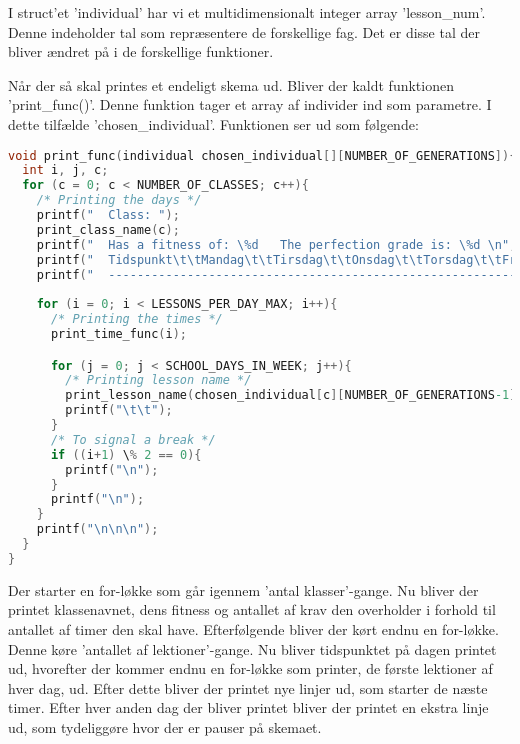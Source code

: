 I struct’et ’individual’ har vi et multidimensionalt integer array ’lesson\_num’. Denne indeholder tal som repræsentere de forskellige fag. Det er disse tal der bliver ændret på i de forskellige funktioner. 

Når der så skal printes et endeligt skema ud. Bliver der kaldt funktionen ’print\_func()’. Denne funktion tager et array af individer ind som parametre. I dette tilfælde ’chosen\_individual’. Funktionen ser ud som følgende:
\begin{lstlisting}[language = C]
void print_func(individual chosen_individual[][NUMBER_OF_GENERATIONS]){
  int i, j, c;
  for (c = 0; c < NUMBER_OF_CLASSES; c++){
    /* Printing the days */
    printf("  Class: ");
    print_class_name(c);
    printf("  Has a fitness of: \%d   The perfection grade is: \%d \n", chosen_individual[c][NUMBER_OF_GENERATIONS-1].fitness, chosen_individual[c][NUMBER_OF_GENERATIONS].perfection);
    printf("  Tidspunkt\t\tMandag\t\tTirsdag\t\tOnsdag\t\tTorsdag\t\tFredag\n");
    printf("  ------------------------------------------------------------------------------------------------\n");
    
    for (i = 0; i < LESSONS_PER_DAY_MAX; i++){
      /* Printing the times */
      print_time_func(i);

      for (j = 0; j < SCHOOL_DAYS_IN_WEEK; j++){
        /* Printing lesson name */
        print_lesson_name(chosen_individual[c][NUMBER_OF_GENERATIONS-1].lesson_num[j][i]);
        printf("\t\t");
      }
      /* To signal a break */
      if ((i+1) \% 2 == 0){
        printf("\n");
      }
      printf("\n");
    }
    printf("\n\n\n");
  }
}
\end{lstlisting}

Der starter en for-løkke som går igennem ’antal klasser’-gange. Nu bliver der printet klassenavnet, dens fitness og antallet af krav den overholder i forhold til antallet af timer den skal have. 
Efterfølgende bliver der kørt endnu en for-løkke. Denne køre ’antallet af lektioner’-gange. Nu bliver tidspunktet på dagen printet ud, hvorefter der kommer endnu en for-løkke som printer, de første lektioner af hver dag, ud. 
Efter dette bliver der printet nye linjer ud, som starter de næste timer. Efter hver anden dag der bliver printet bliver der printet en ekstra linje ud, som tydeliggøre hvor der er pauser på skemaet.
